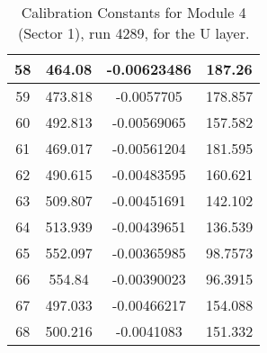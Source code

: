 \begin{table}[h]
{\begin{tabular}{|c|c|c|c|}
58	&	464.08	&	-0.00623486	&	187.26	\\	\hline
59	&	473.818	&	-0.0057705	&	178.857	\\	\hline
60	&	492.813	&	-0.00569065	&	157.582	\\	\hline
61	&	469.017	&	-0.00561204	&	181.595	\\	\hline
62	&	490.615	&	-0.00483595	&	160.621	\\	\hline
63	&	509.807	&	-0.00451691	&	142.102	\\	\hline
64	&	513.939	&	-0.00439651	&	136.539	\\	\hline
65	&	552.097	&	-0.00365985	&	98.7573	\\	\hline
66	&	554.84	&	-0.00390023	&	96.3915	\\	\hline
67	&	497.033	&	-0.00466217	&	154.088	\\	\hline
68	&	500.216	&	-0.0041083	&	151.332	\\	\hline
            \end{tabular}
        }
        \caption{Calibration Constants for Module 4 (Sector 1), run 4289, for the U layer.}
\end{table}


